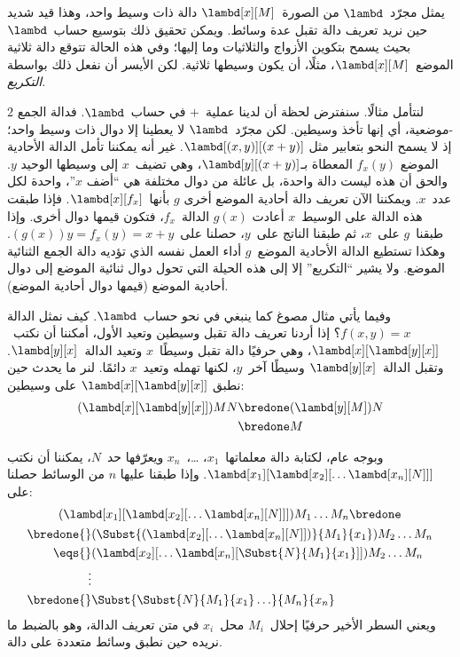 \documentclass[../../../include/open-logic-section]{subfiles}
\begin{document}

يمثل مجرّد~$\lambd$ من الصورة~$\lambd[x][M]$ دالة ذات وسيط واحد، وهذا
قيد شديد حين نريد تعريف دالة تقبل عدة وسائط. ويمكن تحقيق ذلك بتوسيع
حساب~$\lambd$ بحيث يسمح بتكوين الأزواج والثلاثيات وما إليها؛ وفي هذه
الحالة تتوقع دالة ثلاثية الموضع~$\lambd[x][M]$، مثلًا، أن يكون وسيطها
ثلاثية. لكن الأيسر أن نفعل ذلك بواسطة \emph{التكريع}.

لنتأمل مثالًا. سنفترض لحظة أن لدينا عملية~$+$ في حساب~$\lambd$. فدالة
الجمع $2$-موضعية، أي إنها تأخذ وسيطين. لكن مجرّد~$\lambd$ لا يعطينا
إلا دوال ذات وسيط واحد؛ إذ لا يسمح النحو بتعابير مثل
$\lambd[(x,y)][(x+y)]$. غير أنه يمكننا تأمل الدالة الأحادية الموضع
$f_x(y)$ المعطاة بـ$\lambd[y][(x+y)]$، وهي تضيف~$x$ إلى وسيطها الوحيد
$y$. والحق أن هذه ليست دالة واحدة، بل عائلة من دوال مختلفة هي ``أضف
$x$''، واحدة لكل عدد~$x$. ويمكننا الآن تعريف دالة أحادية الموضع أخرى
$g$ بأنها~$\lambd[x][f_x]$. فإذا طبقت هذه الدالة على الوسيط~$x$ أعادت
$g(x)$ الدالة~$f_x$، فتكون قيمها دوال أخرى. وإذا طبقنا~$g$ على~$x$،
ثم طبقنا الناتج على~$y$، حصلنا على~$(g(x))y = f_x(y) = x+y$. وهكذا
تستطيع الدالة الأحادية الموضع~$g$ أداء العمل نفسه الذي تؤديه دالة الجمع
الثنائية الموضع. ولا يشير ``التكريع'' إلا إلى هذه الحيلة التي تحول دوال
ثنائية الموضع إلى دوال أحادية الموضع (قيمها دوال أحادية الموضع).

وفيما يأتي مثال مصوغ كما ينبغي في نحو حساب~$\lambd$. كيف نمثل الدالة
$f(x,y) = x$؟ إذا أردنا تعريف دالة تقبل وسيطين وتعيد الأول، أمكننا أن
نكتب~$\lambd[x][\lambd[y][x]]$، وهي حرفيًا دالة تقبل وسيطًا~$x$ وتعيد
الدالة~$\lambd[y][x]$. وتقبل الدالة~$\lambd[y][x]$ وسيطًا آخر~$y$، لكنها
تهمله وتعيد~$x$ دائمًا. لنر ما يحدث حين نطبق
$\lambd[x][\lambd[y][x]]$ على وسيطين:
\begin{align*}
  (\lambd[x][\lambd[y][x]])MN 
  \bredone & (\lambd[y][M])N \\
  \bredone & M
\end{align*}

وبوجه عام، لكتابة دالة معلماتها~$x_1$، \dots،~$x_n$ ويعرّفها حد~$N$،
يمكننا أن نكتب
$\lambd[x_1][\lambd[x_2][\ldots\lambd[x_n][N]]]$. وإذا طبقنا عليها
$n$ من الوسائط حصلنا على:
\begin{multline*}
  (\lambd[x_1][\lambd[x_2][\ldots\lambd[x_n][N]]]) M_1 \dots M_n \bredone\\
  \begin{aligned}
  \bredone {} & (\Subst{(\lambd[x_2][\ldots\lambd[x_n][N]])}{M_1}{x_1}) M_2
  \dots M_n\\
   \eqs {} & (\lambd[x_2][\ldots\lambd[x_n][\Subst{N}{M_1}{x_1}]]) M_2
            \dots M_n \\
  \vdots & \\
  \bredone {} &\Subst{\Subst{N}{M_1}{x_1}\ldots}{M_n}{x_n}
  \end{aligned}
\end{multline*}
ويعني السطر الأخير حرفيًا إحلال~$M_i$ محل~$x_i$ في متن تعريف الدالة،
وهو بالضبط ما نريده حين نطبق وسائط متعددة على دالة.
\end{document}

